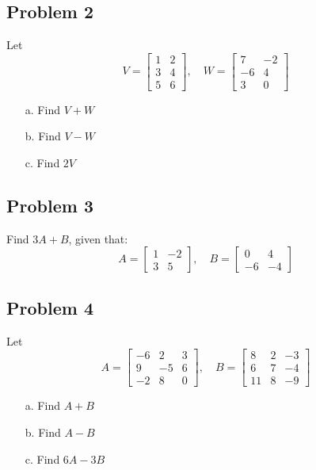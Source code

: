 \documentclass[12pt]{article}
\begin{document}
\subsection*{Problem 2}
Let
\[
V = \begin{bmatrix}
1 & 2 \\
3 & 4 \\
5 & 6
\end{bmatrix}, \quad
W = \begin{bmatrix}
7 & -2 \\
-6 & 4 \\
3 & 0
\end{bmatrix}
\]

\begin{enumerate}
    \item[a.] Find \( V + W \)
    \item[b.] Find \( V - W \)
    \item[c.] Find \( 2V \)
\end{enumerate}

\subsection*{Problem 3}
Find \( 3A + B \), given that:
\[
A = \begin{bmatrix}
1 & -2 \\
3 & 5
\end{bmatrix}, \quad
B = \begin{bmatrix}
0 & 4 \\
-6 & -4
\end{bmatrix}
\]

\subsection*{Problem 4}
Let
\[
A = \begin{bmatrix}
-6 & 2 & 3 \\
9 & -5 & 6 \\
-2 & 8 & 0
\end{bmatrix}, \quad
B = \begin{bmatrix}
8 & 2 & -3 \\
6 & 7 & -4 \\
11 & 8 & -9
\end{bmatrix}
\]

\begin{enumerate}
    \item[a.] Find \( A + B \)
    \item[b.] Find \( A - B \)
    \item[c.] Find \( 6A - 3B \)
\end{enumerate}
\end{document}
